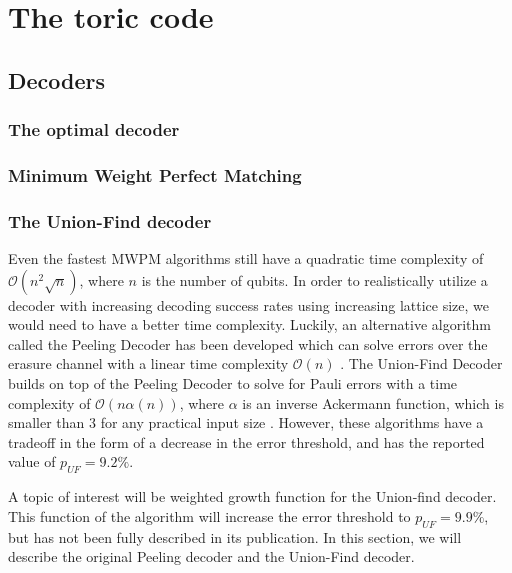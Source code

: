 
\chapter{The toric code}

\section{Decoders}
\subsection{The optimal decoder}
\subsection{Minimum Weight Perfect Matching}
\subsection{The Union-Find decoder}

Even the fastest MWPM algorithms still have a quadratic time complexity of $\mathcal{O}(n^2\sqrt{n})$, where $n$ is the number of qubits. In order to realistically utilize a decoder with increasing decoding success rates using increasing lattice size, we would need to have a better time complexity. Luckily, an alternative algorithm called the Peeling Decoder has been developed which can solve errors over the erasure channel with a linear time complexity $\mathcal{O}(n)$ \cite{delfosse2017}. The Union-Find Decoder builds on top of the Peeling Decoder to solve for Pauli errors with a time complexity of $\mathcal{O}(n\alpha(n))$, where $\alpha$ is an inverse Ackermann function, which is smaller than 3 for any practical input size \cite{nickerson2017}. However, these algorithms have a tradeoff in the form of a decrease in the error threshold, and has the reported value of $p_{UF} = 9.2\%$.

A topic of interest will be weighted growth function for the Union-find decoder. This function of the algorithm will increase the error threshold to $p_{UF} = 9.9\%$, but has not been fully described in its publication.  In this section, we will describe the original Peeling decoder and the Union-Find decoder.   \\

